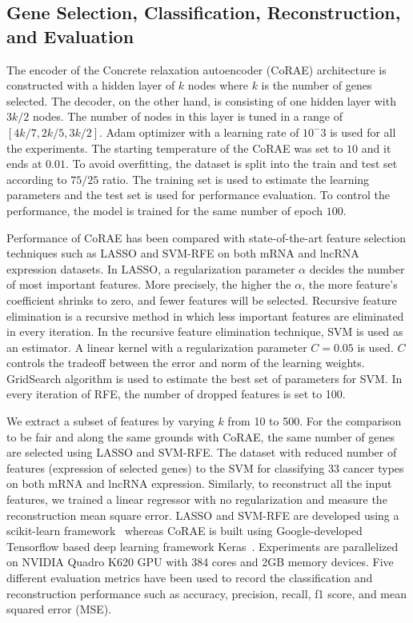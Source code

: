 \documentclass{bioinfo}
\begin{document}
\subsection{Gene Selection, Classification, Reconstruction, and Evaluation} \label{method-details}
The encoder of the Concrete relaxation autoencoder (CoRAE) architecture is constructed with a hidden layer of $k$ nodes where $k$ is the number of genes selected. The decoder, on the other hand, is consisting of one hidden layer with $3k/2$ nodes. 
The number of nodes in this layer is tuned in a range of $[4k/7, 2k/5, 3k/2]$. 
Adam optimizer with a learning rate of $10^-3$ is used for all the experiments. 
The starting temperature of the CoRAE was set to $10$ and it ends at $0.01$. 
To avoid overfitting, the dataset is split into the train and test set according to $75/25$ ratio. 
The training set is used to estimate the learning parameters and the test set is used for performance evaluation. 
To control the performance, the model is trained for the same number of epoch $100$.

 
Performance of CoRAE has been compared with state-of-the-art feature selection techniques such as LASSO and SVM-RFE on both mRNA and lncRNA expression datasets. 
In LASSO, a regularization parameter $\alpha$ decides the number of most important features. 
More precisely, the higher the $\alpha$, the more feature's coefficient shrinks to zero, and fewer features will be selected. Recursive feature elimination is a recursive method in which less important features are eliminated in every iteration. 
In the recursive feature elimination technique, SVM is used as an estimator. 
A linear kernel with a regularization parameter $C=0.05$ is used. $C$ controls the tradeoff between the error and norm of the learning weights. 
GridSearch algorithm is used to estimate the best set of parameters for SVM. 
In every iteration of RFE, the number of dropped features is set to 100. 

We extract a subset of features by varying $k$ from 10 to 500. For the comparison to be fair and along the same grounds with CoRAE, the same number of genes are selected using LASSO and SVM-RFE. 
The dataset with reduced number of features (expression of selected genes) to the SVM for classifying 33 cancer types on both mRNA and lncRNA expression. Similarly, to reconstruct all the input features, we trained a linear regressor with no regularization and measure the reconstruction mean square error. 
LASSO and SVM-RFE are developed using a scikit-learn framework~\citep{scikit-learn} whereas CoRAE is built using Google-developed Tensorflow \citep{tensorflow2015-whitepaper} based deep learning framework Keras~\citep{chollet2015keras}. Experiments are parallelized on NVIDIA Quadro K620 GPU with 384 cores and 2GB memory devices. Five different evaluation metrics have been used to record the classification and reconstruction performance such as accuracy, precision, recall, f1 score, and mean squared error (MSE). 
\end{document}
